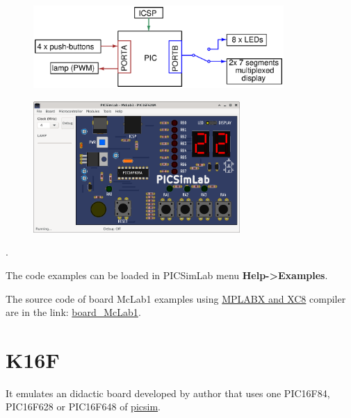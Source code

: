 \begin{figure}[H]
\center
\includegraphics[width=0.85\textwidth]{img/blocks_p1.eps} 
\end{figure} 


\begin{figure}[H]
\center
\includegraphics[width=0.7\textwidth]{img/picsimlab1.png} 
\end{figure} 

.\vspace{0.5cm}

The code examples can be loaded in PICSimLab menu \textbf{Help->Examples}.

The source code of board McLab1 examples using \href{http://www.microchip.com/mplabx}{MPLABX and XC8} compiler 
are in the link: \href{https://lcgamboa.github.io/picsimlab_examples/examples/examples_index.html\#board_McLab1}{board\_McLab1}.




\section{K16F}

It emulates an didactic board developed by author that uses one PIC16F84, PIC16F628 or PIC16F648 of \href{https://github.com/lcgamboa/picsim}{picsim}.

